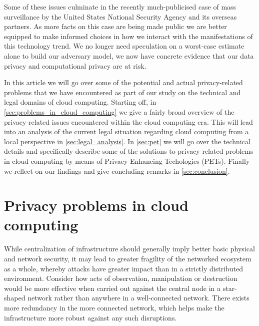 \documentclass[11pt, a4paper]{article}
\begin{document}
Some of these issues culminate in the recently much-publicised case of mass surveillance by the United States National Security Agency and its overseas partners.
As more facts on this case are being made public we are better equipped to make informed choices in how we interact with the manifestations of this technology trend.
We no longer need speculation on a worst-case estimate alone to build our adversary model, we now have concrete evidence that our data privacy and computational privacy are at risk.

In this article we will go over some of the potential and actual privacy-related problems that we have encountered as part of our study on the technical and legal domains of cloud computing. Starting off, in \autoref{sec:problems_in_cloud_computing} we give a fairly broad overview of the privacy-related issues encountered within the cloud computing era.
This will lead into an analysis of the current legal situation regarding cloud computing from a local perspective in \autoref{sec:legal_analysis}. In \autoref{sec:pet} we will go over the technical details and specifically describe some of the solutions to privacy-related problems in cloud computing by means of Privacy Enhancing Techologies (PETs). Finally we reflect on our findings and give concluding remarks in \autoref{sec:conclusion}.

\section{Privacy problems in cloud computing}
\label{sec:problems_in_cloud_computing}

While centralization of infrastructure should generally imply better basic physical and network security, it may lead to greater fragility of the networked ecosystem as a whole, whereby attacks have greater impact than in a strictly distributed environment.
Consider how acts of observation, manipulation or destruction would be more effective when carried out against the central node in a star-shaped network rather than anywhere in a well-connected network.
There exists more redundancy in the more connected network, which helps make the infrastructure more robust against any such disruptions.
\end{document}

